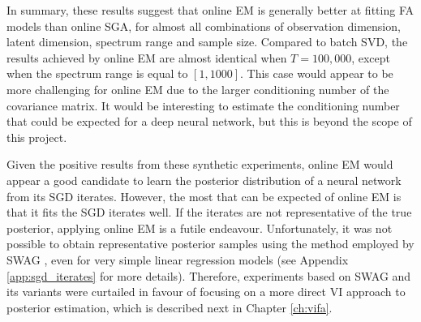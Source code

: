 \documentclass[msc,deptreport.inf]{infthesis} %
\begin{document}
In summary, these results suggest that online EM is generally better at fitting FA models than online SGA, for almost all combinations of observation dimension, latent dimension, spectrum range and sample size. 
Compared to batch SVD, the results achieved by online EM are almost identical when $T=100,000$, except when the spectrum range is equal to $[1, 1000]$. This case would appear to be more challenging for online EM due to the larger conditioning number of the covariance matrix. It would be interesting to estimate the conditioning number that could be expected for a deep neural network, but this is beyond the scope of this project.  

Given the positive results from these synthetic experiments, online EM would appear a good candidate to learn the posterior distribution of a neural network from its SGD iterates. However, the most that can be expected of online EM is that it fits the SGD iterates well. If the iterates are not representative of the true posterior, applying online EM is a futile endeavour. Unfortunately, it was not possible to obtain representative posterior samples using the method employed by SWAG \cite{maddox2019}, even for very simple linear regression models (see Appendix \ref{app:sgd_iterates} for more details). Therefore, experiments based on SWAG and its variants were curtailed in favour of focusing on a more direct VI approach to posterior estimation, which is described next in Chapter \ref{ch:vifa}.
\end{document}

